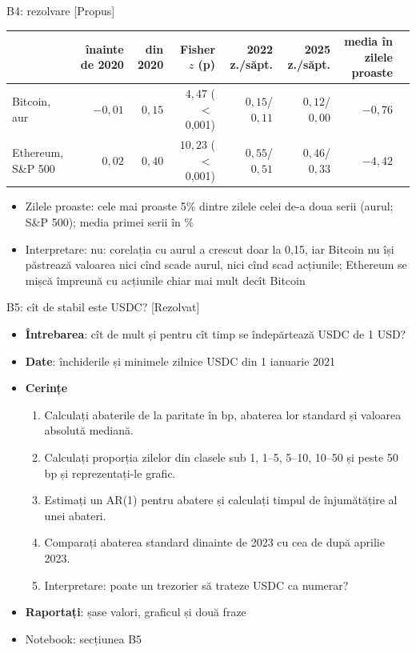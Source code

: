 \ifsolutions
\begin{frame}{B4: rezolvare [Propus]}
\itemsize{\footnotesize}
\begin{center}
\scriptsize
\begin{tabular}{lrrrrrrr}
\toprule
& înainte de 2020 & din 2020 & Fisher $z$ (p) & 2022 z./săpt. & 2025 z./săpt. & media în zilele proaste \\
\midrule
Bitcoin, aur & $-0{,}01$ & $0{,}15$ & $4{,}47$ ($<$\,0{,}001) & $0{,}15$/$0{,}11$ & $0{,}12$/$0{,}00$ & $-0{,}76$ \\
Ethereum, S\&P 500 & $0{,}02$ & $0{,}40$ & $10{,}23$ ($<$\,0{,}001) & $0{,}55$/$0{,}51$ & $0{,}46$/$0{,}33$ & $-4{,}42$ \\
\bottomrule
\end{tabular}
\end{center}
\begin{itemize}
    \item Zilele proaste: cele mai proaste 5\% dintre zilele celei de-a doua serii (aurul; S\&P 500); media primei serii în \%
    \item Interpretare: nu: corelația cu aurul a crescut doar la 0{,}15, iar Bitcoin nu își păstrează valoarea nici cînd scade aurul, nici cînd scad acțiunile; Ethereum se mișcă împreună cu acțiunile chiar mai mult decît Bitcoin
\end{itemize}
\end{frame}
\fi

\begin{frame}{B5: cît de stabil este USDC? [Rezolvat]}
\itemsize{\footnotesize}
\begin{itemize}
\item \textbf{Întrebarea}: cît de mult și pentru cît timp se îndepărtează USDC de 1 USD?
\item \textbf{Date}: închiderile și minimele zilnice USDC din 1 ianuarie 2021
\item \textbf{Cerințe}
\begin{enumerate}
    \item Calculați abaterile de la paritate în bp, abaterea lor standard și valoarea absolută mediană.
    \item Calculați proporția zilelor din clasele sub 1, 1--5, 5--10, 10--50 și peste 50 bp și reprezentați-le grafic.
    \item Estimați un AR(1) pentru abatere și calculați timpul de înjumătățire al unei abateri.
    \item Comparați abaterea standard dinainte de 2023 cu cea de după aprilie 2023.
    \item Interpretare: poate un trezorier să trateze USDC ca numerar?
\end{enumerate}
\item \textbf{Raportați}: șase valori, graficul și două fraze
\item Notebook: secțiunea B5
\end{itemize}
\end{frame}

